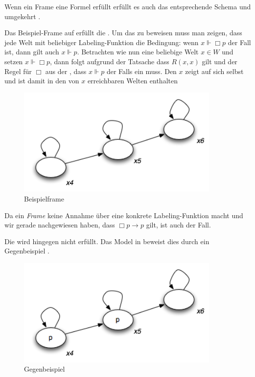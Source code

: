 Wenn ein Frame eine Formel erfüllt erfüllt es auch das entsprechende Schema und umgekehrt .

\begin{example}
	Das Beispiel-Frame auf  erfüllt die \TFormel.
	Um das zu beweisen muss man zeigen, dass jede Welt mit beliebiger Labeling-Funktion die Bedingung: wenn $x \Vdash \Box p$ der Fall ist, dann gilt auch $x \Vdash p$.
	Betrachten wie nun eine beliebige Welt $x \in W$ und setzen $x \Vdash \Box p$, dann folgt aufgrund der Tatsache dass $R(x,x)$ gilt und der Regel für $\Box$ aus der , dass $x \Vdash p$ der Falls ein muss.
	Den $x$ zeigt auf sich selbst und ist damit in den von $x$ erreichbaren Welten enthalten

	\begin{figure}[h!]
		\centering
		\includegraphics[width=10cm]{Images/Kripke02}
		\caption{Beispielframe}
		\label{fig:Kripke02}
	\end{figure}

	Da ein \emph{Frame} keine Annahme über eine konkrete Labeling-Funktion macht und wir gerade nachgewiesen haben, dass $\Box p \rightarrow p$ gilt, ist auch \TFormel der Fall.
	
	Die \vierFormel wird hingegen nicht erfüllt.
	Das Model in  beweist dies durch ein Gegenbeispiel
	.

	\begin{figure}[h!]
		\centering
		\includegraphics[width=10cm]{Images/Kripke03}
		\caption{Gegenbeispiel}
		\label{fig:Kripke03}
	\end{figure}

\end{example}

